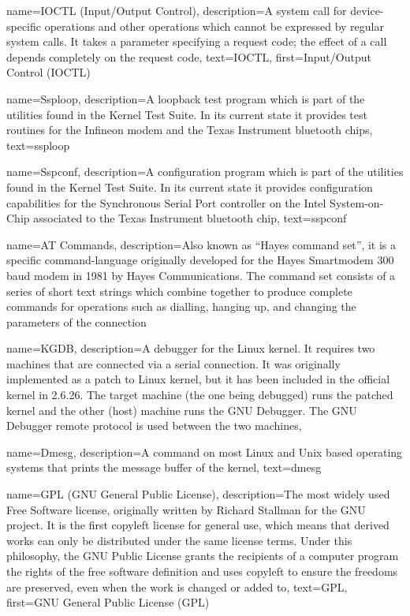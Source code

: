 {
  name=IOCTL (Input/Output Control),
  description={A system call for device-specific operations and other
    operations which cannot be expressed by regular system calls. It
    takes a parameter specifying a request code; the effect of a call
    depends completely on the request code},
  text=IOCTL,
  first=Input/Output Control (IOCTL)
}

{
  name=Ssploop,
  description={A loopback test program which is part of the utilities
    found in the Kernel Test Suite. In its current state it provides
    test routines for the Infineon modem and the Texas Instrument
    bluetooth chips},
  text=ssploop
}

{
  name=Sspconf,
  description={A configuration program which is part of the utilities
    found in the Kernel Test Suite. In its current state it provides
    configuration capabilities for the Synchronous Serial Port
    controller on the Intel System-on-Chip associated to the Texas
    Instrument bluetooth chip},
  text=sspconf
}

{
  name=AT Commands,
  description={Also known as ``Hayes command set'', it is a specific
    command-language originally developed for the Hayes Smartmodem 300
    baud modem in 1981 by Hayes Communications. The command set
    consists of a series of short text strings which combine together
    to produce complete commands for operations such as dialling,
    hanging up, and changing the parameters of the connection}
}

{
  name=KGDB,
  description={A debugger for the Linux kernel. It requires two
    machines that are connected via a serial connection. It was
    originally implemented as a patch to Linux kernel, but it has been
    included in the official kernel in 2.6.26. The target machine (the
    one being debugged) runs the patched kernel and the other (host)
    machine runs the GNU Debugger. The GNU Debugger remote protocol is
    used between the two machines},
}

{
  name=Dmesg,
  description={A command on most Linux and Unix based operating
    systems that prints the message buffer of the kernel},
  text=dmesg
}

{
  name=GPL (GNU General Public License),
  description={The most widely used Free Software license, originally
    written by Richard Stallman for the GNU project. It is the first
    copyleft license for general use, which means that derived works
    can only be distributed under the same license terms. Under this
    philosophy, the GNU Public License grants the recipients of a
    computer program the rights of the free software definition and
    uses copyleft to ensure the freedoms are preserved, even when the
    work is changed or added to},
  text=GPL,
  first=GNU General Public License (GPL)
}

